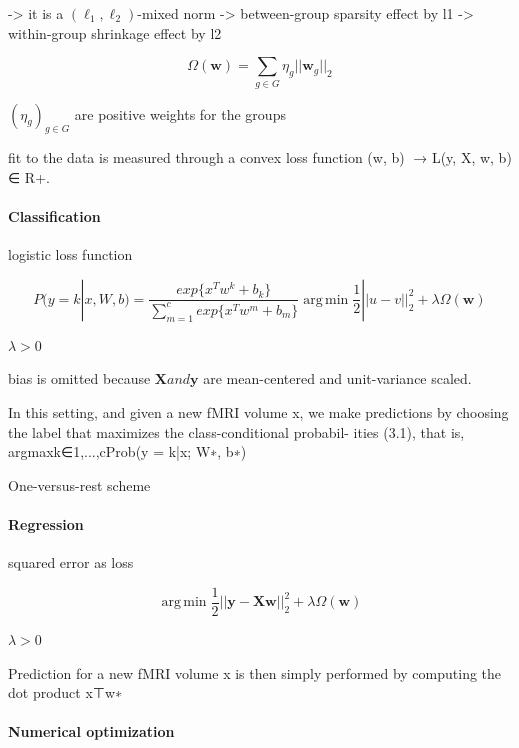 \documentclass{article} %
\DeclareMathOperator*{\argmin}{arg\,min}
\begin{document}
-> it is a $(\ell_1, \ell_2)$-mixed norm
-> between-group sparsity effect by l1
-> within-group shrinkage effect by l2


\begin{equation}
  \Omega(\mathbf{w}) = \sum_{g \in G} \eta_g ||\mathbf{w}_g||_2
\end{equation}

$(\eta_g)_{g \in G}$ are positive weights for the groups


fit to the data is measured through
a convex loss function (w, b) 􏰀→ L(y, X, w, b) ∈ R+. 


\paragraph{Classification}

logistic loss function

\begin{equation}
  P(y=k|x, W, b) = \frac{exp\{x^Tw^k + b_k\}}{\sum_{m=1}^cexp\{x^Tw^m + b_m\}}
  \argmin \frac{1}{2}||u-v||_2^2 + \lambda\Omega(\mathbf{w})
\end{equation}

$\lambda > 0$

bias is omitted because $\mathbf{X} and \mathbf{y}$
are mean-centered and unit-variance scaled.

In this setting, and given a new fMRI volume x,
we make predictions by choosing the label that maximizes
the class-conditional probabil- ities (3.1), that is, argmaxk∈{1,...,c}Prob(y = k|x; W∗, b∗)

One-versus-rest scheme


\paragraph{Regression}

squared error as loss

\begin{equation}
  \argmin \frac{1}{2}||\mathbf{y - Xw}||_2^2 + \lambda\Omega(\mathbf{w})
\end{equation}

$\lambda > 0$

Prediction for a new fMRI volume x is then simply performed by computing
the dot product x⊤w∗

\paragraph{Numerical optimization}
\end{document}
